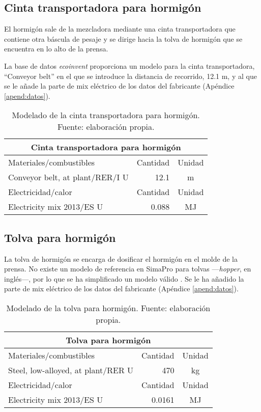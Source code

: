 \subsection{Cinta transportadora para hormigón}

El hormigón sale de la mezcladora mediante una cinta transportadora que contiene otra báscula de pesaje y se dirige hacia la tolva de hormigón que se encuentra en lo alto de la prensa.

La base de datos \textit{ecoinvent} proporciona un modelo para la cinta transportadora, ``Conveyor belt'' en el que se introduce la distancia de recorrido, 12.1 \si{m}, y al que se le añade la parte de mix eléctrico de los datos del fabricante (Apéndice \ref{apend:datos}).

\begin{table}[!htb]
\centering
\begin{tabular}{p{8cm}rc}
\toprule
\multicolumn{3}{c}{Cinta transportadora para hormigón}\\
\midrule
Materiales/combustibles & Cantidad & Unidad\\
\midrule
Conveyor belt, at plant/RER/I U & 12.1 & \si{m}\\
\midrule
Electricidad/calor & Cantidad & Unidad\\
\midrule
Electricity mix 2013/ES U & 0.088 & \si{MJ}\\
\bottomrule
\end{tabular}
\caption[Modelado de la cinta transportadora para hormigón.]{Modelado de la cinta transportadora para hormigón. Fuente: elaboración propia.}
\label{modeladodecintahormigon}
\end{table}

\subsection{Tolva para hormigón}

La tolva de hormigón se encarga de dosificar el hormigón en el molde de la prensa. No existe un modelo de referencia en SimaPro para tolvas —\textit{hopper}, en inglés—, por lo que se ha simplificado un modelo válido \cite{foodnottrash}. Se le ha añadido la parte de mix eléctrico de los datos del fabricante (Apéndice \ref{apend:datos}).

\begin{table}[!htb]
\centering
\begin{tabular}{p{8cm}rc}
\toprule
\multicolumn{3}{c}{Tolva para hormigón}\\
\midrule
Materiales/combustibles & Cantidad & Unidad\\
\midrule
Steel, low-alloyed, at plant/RER U & 470 & \si{kg}\\
\midrule
Electricidad/calor & Cantidad & Unidad\\
\midrule
Electricity mix 2013/ES U & 0.0161 & \si{MJ}\\
\bottomrule
\end{tabular}
\caption[Modelado de la tolva para hormigón.]{Modelado de la tolva para hormigón. Fuente: elaboración propia.}
\label{modeladotolvahormigon}
\end{table}

